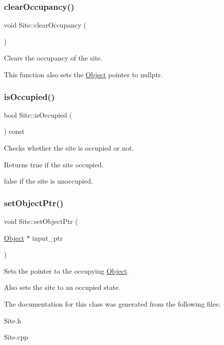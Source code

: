 \subsubsection{\texorpdfstring{clear\+Occupancy()}{clearOccupancy()}}
{\footnotesize\ttfamily void Site\+::clear\+Occupancy (\begin{DoxyParamCaption}{ }\end{DoxyParamCaption})}



Clears the occupancy of the site. 

This function also sets the \hyperlink{class_object}{Object} pointer to nullptr. \mbox{\label{class_site_a30991b768ded0bb441c5bb54a789160a}} 
\subsubsection{\texorpdfstring{is\+Occupied()}{isOccupied()}}
{\footnotesize\ttfamily bool Site\+::is\+Occupied (\begin{DoxyParamCaption}{ }\end{DoxyParamCaption}) const}



Checks whether the site is occupied or not. 

\begin{DoxyReturn}{Returns}
true if the site occupied. 

false if the site is unoccupied. 
\end{DoxyReturn}
\mbox{\label{class_site_a9a0d305451d7732dbb193e7fd2f502ca}} 
\subsubsection{\texorpdfstring{set\+Object\+Ptr()}{setObjectPtr()}}
{\footnotesize\ttfamily void Site\+::set\+Object\+Ptr (\begin{DoxyParamCaption}\item[{\hyperlink{class_object}{Object} $\ast$}]{input\+\_\+ptr }\end{DoxyParamCaption})}



Sets the pointer to the occupying \hyperlink{class_object}{Object}. 

Also sets the site to an occupied state. 

The documentation for this class was generated from the following files\+:\begin{DoxyCompactItemize}
\item 
Site.\+h\item 
Site.\+cpp\end{DoxyCompactItemize}
